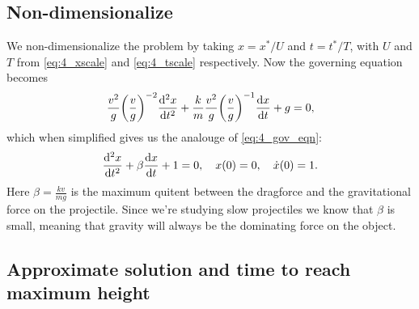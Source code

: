 \documentclass[11pt,letter, swedish, english
]{article}
\begin{document}
\subsection{Non-dimensionalize}
We non-dimensionalize the problem by taking $x=x^*/U$ and $t=t^*/T$,
with $U$ and $T$ from \eqref{eq:4_xscale} and \eqref{eq:4_tscale}
respectively. Now the governing equation becomes
\begin{equation}
\frac{v^2}{g}\qty(\frac{v}{g})^{-2}\dv[2]{x}{t} 
+ \frac{k}{m} \frac{v^2}{g}\qty(\frac{v}{g})^{-1}\dv{x}{t}
+ g = 0,
\end{equation}
which when simplified gives us the analouge of \eqref{eq:4_gov_eqn}:
\begin{equation}
\dv[2]{x}{t} + \beta\dv{x}{t} + 1 = 0\qcomma
x(0)=0\qcomma \dot{x}(0)=1.
\end{equation}
Here $\beta=\frac{kv}{mg}$ is the maximum quitent between the
dragforce and the gravitational force on the projectile. Since we're
studying slow projectiles we know that $\beta$ is small, meaning that
gravity will always be the dominating force on the object. 

\subsection{Approximate solution and time to reach maximum height}
\end{document}
